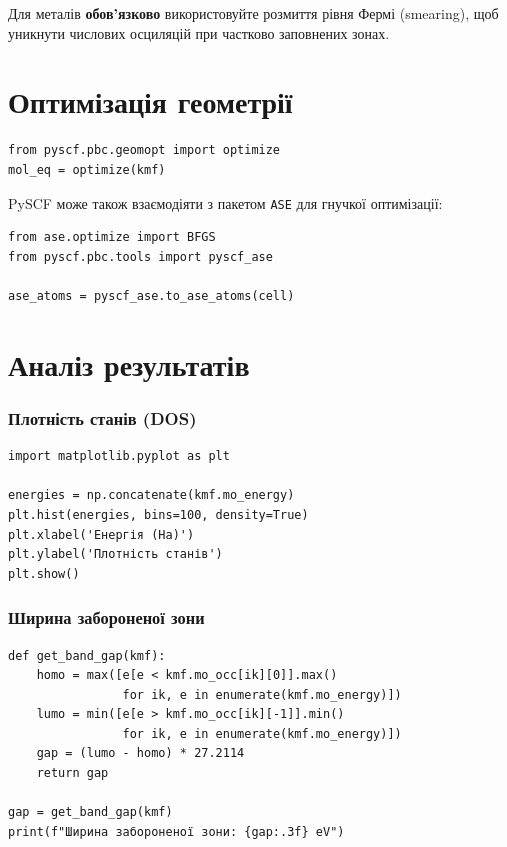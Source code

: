 Для металів \textbf{обов’язково} використовуйте розмиття рівня Фермі (smearing), щоб уникнути числових осциляцій при частково заповнених зонах.

\section{Оптимізація геометрії}

\begin{verbatim}
from pyscf.pbc.geomopt import optimize
mol_eq = optimize(kmf)
\end{verbatim}

PySCF може також взаємодіяти з пакетом \texttt{ASE} для гнучкої оптимізації:
\begin{verbatim}
from ase.optimize import BFGS
from pyscf.pbc.tools import pyscf_ase

ase_atoms = pyscf_ase.to_ase_atoms(cell)
\end{verbatim}

\section{Аналіз результатів}

\subsubsection{Плотність станів (DOS)}

\begin{verbatim}
import matplotlib.pyplot as plt

energies = np.concatenate(kmf.mo_energy)
plt.hist(energies, bins=100, density=True)
plt.xlabel('Енергія (Ha)')
plt.ylabel('Плотність станів')
plt.show()
\end{verbatim}

\subsubsection{Ширина забороненої зони}

\begin{verbatim}
def get_band_gap(kmf):
    homo = max([e[e < kmf.mo_occ[ik][0]].max()
                for ik, e in enumerate(kmf.mo_energy)])
    lumo = min([e[e > kmf.mo_occ[ik][-1]].min()
                for ik, e in enumerate(kmf.mo_energy)])
    gap = (lumo - homo) * 27.2114
    return gap

gap = get_band_gap(kmf)
print(f"Ширина забороненої зони: {gap:.3f} eV")
\end{verbatim}

